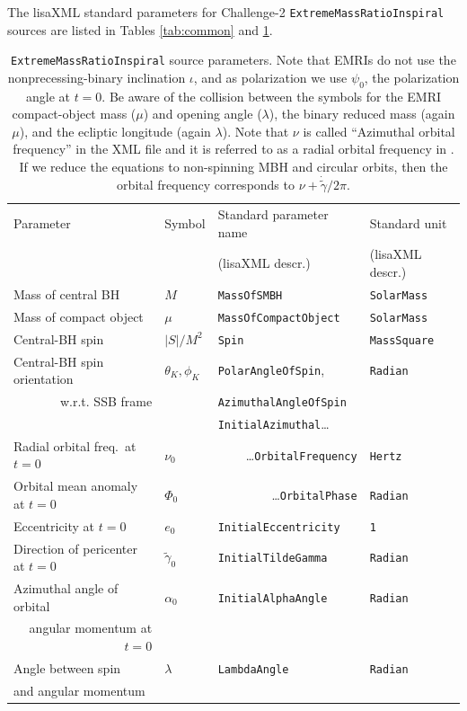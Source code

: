 \documentclass[12pt]{iopart}
\begin{document}
The lisaXML standard parameters for Challenge-2 \texttt{ExtremeMassRatioInspiral} sources are listed in Tables \ref{tab:common} and \ref{tab:emri}.
%
\begin{table}
\begin{tabular}{llll}
\hline
{Parameter} &
{Symbol} &
{Standard parameter name} &
{Standard unit} \\
& & (lisaXML descr.) & (lisaXML descr.) \\
\hline
Mass of central BH     & $M$      & \texttt{MassOfSMBH}           & \texttt{SolarMass} \\
Mass of compact object & $\mu$  & \texttt{MassOfCompactObject}  & \texttt{SolarMass} \\
Central-BH spin        & $|S|/M^2$  & \texttt{Spin}      & \texttt{MassSquare} \\
Central-BH spin orientation & $\theta_K, \phi_K$ & \texttt{PolarAngleOfSpin}, & \texttt{Radian} \\
 \multicolumn{1}{r}{w.r.t. SSB frame}  &                         & \texttt{AzimuthalAngleOfSpin} & \\ \hline
& & \texttt{InitialAzimuthal}\ldots & \\                   
Radial orbital freq.\ at $t = 0$ & $\nu_0$ & \multicolumn{1}{r}{\ldots\texttt{OrbitalFrequency}} & \texttt{Hertz} \\
Orbital mean anomaly at $t = 0$ & $\Phi_0$ & \multicolumn{1}{r}{\ldots\texttt{OrbitalPhase}} & \texttt{Radian} \\ \hline
Eccentricity at $t = 0$ & $e_0$ & \texttt{InitialEccentricity} & \texttt{1} \\
Direction of pericenter at $t = 0$ & $\tilde{\gamma}_0$ & \texttt{InitialTildeGamma} & \texttt{Radian} \\
Azimuthal angle of orbital & $\alpha_0$ & \texttt{InitialAlphaAngle} & \texttt{Radian} \\
\multicolumn{1}{r}{angular momentum at $t = 0$} & & & \\
Angle between spin  & $\lambda$ & \texttt{LambdaAngle} & \texttt{Radian} \\ 
and angular momentum & & &\\
\hline
\end{tabular}
\caption{\texttt{ExtremeMassRatioInspiral} source parameters. Note that EMRIs do not use the nonprecessing-binary inclination $\iota$, 
and as polarization we use $\psi_0$, the polarization angle at $t=0$.
Be aware of the collision between the symbols for the EMRI compact-object mass ($\mu$) and opening angle ($\lambda$), the binary reduced mass (again $\mu$), and the ecliptic longitude (again $\lambda$). Note that $\nu$ is called ``Azimuthal orbital frequency'' in the XML file and it is referred to as a radial orbital frequency in \cite{BC}.
If we reduce the equations to non-spinning MBH and circular orbits, then 
the orbital frequency corresponds to $\nu + \dot{\tilde{\gamma}}/{2\pi}$.
\label{tab:emri}}
\end{table}
\end{document}
